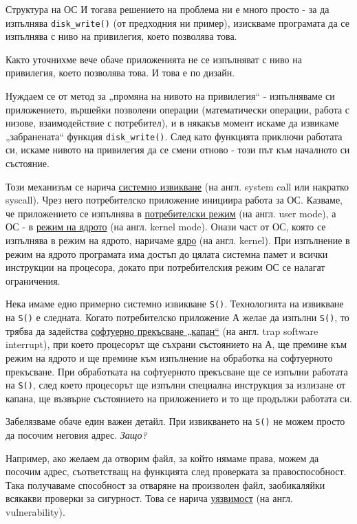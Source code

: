 \documentclass[14pt, aspectratio=169]{beamer}
\begin{document}
\begin{frame}[allowframebreaks]{Структура на ОС}
  И тогава решението на проблема ни е много просто - за да изпълнява
  \texttt{disk\_write()} (от предходния ни пример), изискваме програмата да се
  изпълнява с ниво на привилегия, което позволява това.

  Както уточнихме вече обаче приложенията не се изпълняват с ниво на
  привилегия, което позволява това. И това е по дизайн.

  Нуждаем се от метод за „промяна на нивото на привилегия“ - изпълняваме си
  приложението, вършейки позволени операции (математически операции, работа с
  низове, взаимодействие с потребител), и в някакъв момент искаме да извикаме
  „забранената“ функция \texttt{disk\_write()}. След като функцията приключи
  работата си, искаме нивото на привилегия да се смени отново - този път към
  началното си състояние.

  Този механизъм се нарича \underline{системно извикване} (на англ. system
  call или накратко syscall). Чрез него потребителско приложение инициира
  работа за ОС. Казваме, че приложението се изпълнява в
  \underline{потребителски режим} (на англ. user mode), а ОС - в
  \underline{режим на ядрото} (на англ. kernel mode). Онази част от ОС, която
  се изпълнява в режим на ядрото, наричаме \underline{ядро} (на англ.
  kernel). При изпълнение в режим на ядрото програмата има достъп до цялата
  системна памет и всички инструкции на процесора, докато при потребителския
  режим ОС се налагат ограничения.

  Нека имаме едно примерно системно извикване \texttt{S()}. Технологията на
  извикване на \texttt{S()} е следната. Когато потребителско приложение А
  желае да изпълни \texttt{S()}, то трябва да задейства \underline{софтуерно
    прекъсване „капан“} (на англ. trap software interrupt), при което
  процесорът ще съхрани състоянието на А, ще премине към режим на ядрото и ще
  премине към изпълнение на обработка на софтуерното прекъсване. При
  обработката на софтуерното прекъсване ще се изпълни работата на
  \texttt{S()}, след което процесорът ще изпълни специална инструкция за
  излизане от капана, ще възвърне състоянието на приложението и то ще
  продължи работата си.

  Забелязваме обаче един важен детайл. При извикването на \texttt{S()} не
  можем просто да посочим неговия адрес. \emph{Защо?}

  Например, ако желаем да отворим файл, за който нямаме права, можем да
  посочим адрес, съответстващ на функцията след проверката за
  правоспособност. Така получаваме способност за отваряне на произволен файл,
  заобикаляйки всякакви проверки за сигурност. Това се нарича
  \underline{уязвимост} (на англ. vulnerability).


\end{frame}
\end{document}
